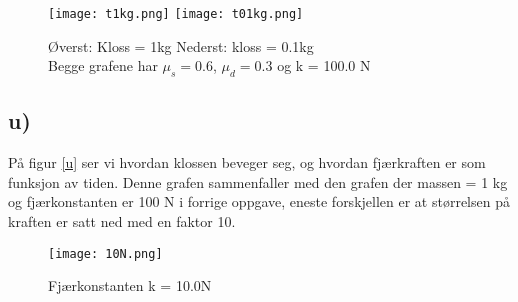 \documentclass[a4paper,12pt,norsk]{article}
\begin{document}

\begin{figure}[h!]
\texttt{[image: t1kg.png]} 
\texttt{[image: t01kg.png]} 
\caption{Øverst: Kloss = 1kg Nederst: kloss = 0.1kg \\Begge grafene har $\mu_s = 0.6$, $\mu_d = 0.3$ og k = 100.0 N}
\label{s}
\end{figure} 

\subsection*{u)}
På figur \vref{u} ser vi hvordan klossen beveger seg, og hvordan fjærkraften er som funksjon av tiden. Denne grafen sammenfaller med den grafen der massen = 1 kg og fjærkonstanten er 100 N i forrige oppgave, eneste forskjellen er at størrelsen på kraften er satt ned med en faktor 10. 

\begin{figure}[h!]
\texttt{[image: 10N.png]} 
\caption{Fjærkonstanten k = 10.0N}
\label{u}
\end{figure} 
\end{document}
